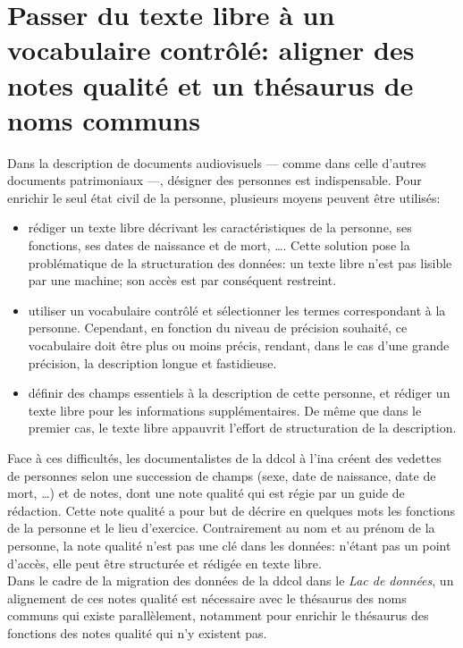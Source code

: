 \section{\label{I-C-3}Passer du texte libre à un vocabulaire contrôlé: aligner des notes qualité et un thésaurus de noms communs}

Dans la description de documents audiovisuels --- comme dans celle d'autres documents patrimoniaux ---, désigner des personnes est indispensable. Pour enrichir le seul état civil de la personne, plusieurs moyens peuvent être utilisés:
\begin{itemize}
	\item rédiger un texte libre décrivant les caractéristiques de la personne, ses fonctions, ses dates de naissance et de mort, \dots. Cette solution pose la problématique de la structuration des données: un texte libre n'est pas lisible par une machine; son accès est par conséquent restreint.
	\item utiliser un vocabulaire contrôlé et sélectionner les termes correspondant à la personne. Cependant, en fonction du niveau de précision souhaité, ce vocabulaire doit être plus ou moins précis, rendant, dans le cas d'une grande précision, la description longue et fastidieuse.
	\item définir des champs essentiels à la description de cette personne, et rédiger un texte libre pour les informations supplémentaires. De même que dans le premier cas, le texte libre appauvrit l'effort de structuration de la description.
\end{itemize}
Face à ces difficultés, les documentalistes de la \ac{ddcol} à l'\ac{ina} créent des vedettes de personnes selon une succession de champs (sexe, date de naissance, date de mort, \dots) et de notes, dont une note qualité qui est régie par un guide de rédaction. Cette note qualité a pour but de décrire en quelques mots les fonctions de la personne et le lieu d'exercice. Contrairement au nom et au prénom de la personne, la note qualité n'est pas une clé dans les données: n'étant pas un point d'accès, elle peut être structurée et rédigée en texte libre.\\

Dans le cadre de la migration des données de la \ac{ddcol} dans le \textit{Lac de données}, un alignement de ces notes qualité est nécessaire avec le thésaurus des noms communs qui existe parallèlement, notamment pour enrichir le thésaurus des fonctions des notes qualité qui n'y existent pas.

